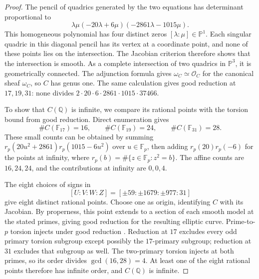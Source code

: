 \documentclass[draft]{publmathdeb}
\theoremstyle{remark}
\numberwithin{equation}{section}
\newcommand{\Q}{\mathbb Q}
\newcommand{\F}{\mathbb F}
\begin{document}
\begin{proof}
  The pencil of quadrics generated by the two equations has determinant proportional to
  \[
    \lambda\mu(-20\lambda+6\mu)(-2861\lambda-1015\mu).
  \]
  This homogeneous polynomial has four distinct zeros $[\lambda:\mu]\in\mathbb P^1$. Each singular quadric in this diagonal pencil has its vertex at a coordinate point, and none of these points lies on the intersection. The Jacobian criterion therefore shows that the intersection is smooth. As a complete intersection of two quadrics in $\mathbb P^3$, it is geometrically connected. The adjunction formula gives $\omega_C\simeq\mathcal O_C$ for the canonical sheaf $\omega_C$, so $C$ has genus one. The same calculation gives good reduction at $17,19,31$: none divides $2\cdot20\cdot6\cdot2861\cdot1015\cdot37466$.

  To show that $C(\Q)$ is infinite, we compare its rational points with the torsion bound from good reduction. Direct enumeration gives
  \[
    \#C(\F_{17})=16,\qquad \#C(\F_{19})=24,\qquad \#C(\F_{31})=28.
  \]
  These small counts can be obtained by summing $r_p(20u^2+2861)r_p(1015-6u^2)$ over $u\in\F_p$, then adding $r_p(20)r_p(-6)$ for the points at infinity, where $r_p(b)=\#\{z\in\F_p:z^2=b\}$. The affine counts are $16,24,24$, and the contributions at infinity are $0,0,4$.

  The eight choices of signs in
  \[
    [U:V:W:Z]=[\pm59:\pm1679:\pm977:31]
  \]
  give eight distinct rational points. Choose one as origin, identifying $C$ with its Jacobian. By properness, this point extends to a section of each smooth model at the stated primes, giving good reduction for the resulting elliptic curve. Prime-to-$p$ torsion injects under good reduction \cite[Proposition VII.3.1(b)]{Silverman2009}. Reduction at $17$ excludes every odd primary torsion subgroup except possibly the $17$-primary subgroup; reduction at $31$ excludes that subgroup as well. The two-primary torsion injects at both primes, so its order divides $\gcd(16,28)=4$. At least one of the eight rational points therefore has infinite order, and $C(\Q)$ is infinite.


\end{proof}
\end{document}
